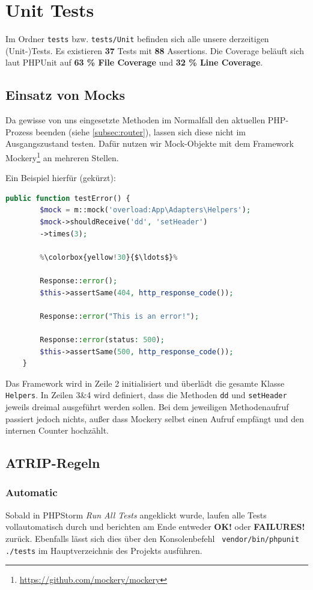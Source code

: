 \documentclass[12pt,a4paper,titlepage,ngerman,pdftex]{report}
\begin{document}
    \section{Unit Tests}
    Im Ordner \verb|tests| bzw. \verb|tests/Unit| befinden sich alle unsere derzeitigen (Unit-)Tests.
    Es existieren \textbf{37} Tests mit \textbf{88} Assertions.
    Die Coverage beläuft sich laut PHPUnit auf \textbf{63 \% File Coverage} und \textbf{32 \% Line Coverage}.

    \subsection{Einsatz von Mocks}
    Da gewisse von uns eingesetzte Methoden im Normalfall den aktuellen PHP-Prozess beenden (siehe \ref{subsec:router}), lassen sich diese nicht im Ausgangszustand testen.
    Dafür nutzen wir Mock-Objekte mit dem Framework Mockery\footnote{\url{https://github.com/mockery/mockery}} an mehreren Stellen.

    Ein Beispiel hierfür (gekürzt):
    \begin{lstlisting}[language=php,label={lst:mockery},escapechar=\%,caption={Einsatz von Mockery}]
    public function testError() {
        $mock = m::mock('overload:App\Adapters\Helpers');
        $mock->shouldReceive('dd', 'setHeader')
        ->times(3);

        %\colorbox{yellow!30}{$\ldots$}%

        Response::error();
        $this->assertSame(404, http_response_code());

        Response::error("This is an error!");

        Response::error(status: 500);
        $this->assertSame(500, http_response_code());
    }\end{lstlisting}

    Das Framework wird in Zeile 2 initialisiert und überlädt die gesamte Klasse \verb|Helpers|.
    In Zeilen 3\&4 wird definiert, dass die Methoden \verb|dd| und \verb|setHeader| jeweils dreimal ausgeführt werden sollen.
    Bei dem jeweiligen Methodenaufruf passiert jedoch nichts, außer dass Mockery selbst einen Aufruf empfängt und den internen Counter hochzählt.

    \subsection{ATRIP-Regeln}
    \label{subsec:atrip-regeln}

    \subsubsection{Automatic}
    Sobald in PHPStorm \textit{Run All Tests} angeklickt wurde, laufen alle Tests vollautomatisch durch und berichten am Ende entweder \textbf{OK!} oder \textbf{FAILURES!} zurück.
    Ebenfalls lässt sich dies über den Konsolenbefehl \verb| vendor/bin/phpunit ./tests| im Hauptverzeichnis des Projekts ausführen.
\end{document}

